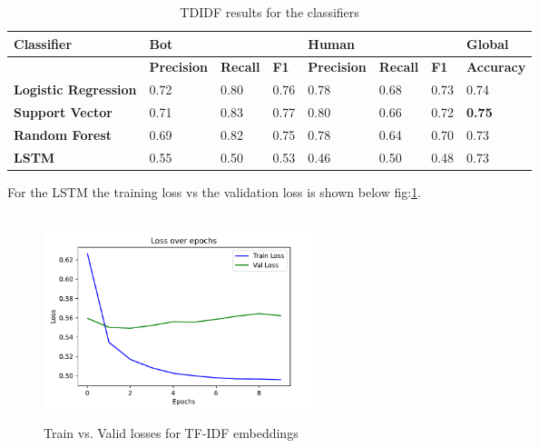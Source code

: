 \documentclass[12pt]{article}
\begin{document}
\begin{table}[ht]
\begin{tabular}{|l|lll|lll|l|}
\hline
\textbf{Classifier}          & \multicolumn{3}{l|}{\textbf{Bot}}                                                          & \multicolumn{3}{l|}{\textbf{Human}}                                                            & \textbf{Global}   \\ \hline
\textbf{}                    & \multicolumn{1}{l|}{\textbf{Precision}} & \multicolumn{1}{l|}{\textbf{Recall}} & \textbf{F1} & \multicolumn{1}{l|}{\textbf{Precision}} & \multicolumn{1}{l|}{\textbf{Recall}} & \textbf{F1} & \textbf{Accuracy} \\ \hline
\textbf{Logistic Regression} & \multicolumn{1}{l|}{0.72}               & \multicolumn{1}{l|}{0.80}            & 0.76        & \multicolumn{1}{l|}{0.78}               & \multicolumn{1}{l|}{0.68}            & 0.73        & 0.74              \\ \hline
\textbf{Support Vector}      & \multicolumn{1}{l|}{0.71}               & \multicolumn{1}{l|}{0.83}            & 0.77        & \multicolumn{1}{l|}{0.80}               & \multicolumn{1}{l|}{0.66}            & 0.72        & \textbf{0.75}              \\ \hline
\textbf{Random Forest}       & \multicolumn{1}{l|}{0.69}               & \multicolumn{1}{l|}{0.82}            & 0.75        & \multicolumn{1}{l|}{0.78}               & \multicolumn{1}{l|}{0.64}            & 0.70        & 0.73              \\ \hline
\textbf{LSTM}                & \multicolumn{1}{l|}{0.55}                   & \multicolumn{1}{l|}{0.50}                & 0.53 & \multicolumn{1}{l|}{0.46}                   & \multicolumn{1}{l|}{0.50}                &0.48             & 0.73             \\ \hline
\end{tabular}
\caption{TDIDF results for the classifiers}
\label{table:tdidf}
\end{table}
 For the LSTM the training loss vs the validation loss is shown below fig:\ref{fig:tfidf_loss}.
\begin{figure}[h!]
	\centering
	\caption{Train vs. Valid losses for TF-IDF embeddings}
	\label{fig:tfidf_loss}
	\includegraphics[width=8cm, height=6cm]{tfidf_loss} 
\end{figure}
\end{document}
